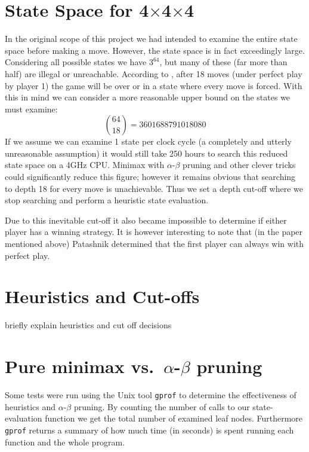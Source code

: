 \documentclass[10pt,twocolumn]{article}
\begin{document}
\section{State Space for 4$\times$4$\times$4}
In the original scope of this project we had intended to examine the entire state space
before making a move. However, the state space is in fact exceedingly large. Considering all
possible states we have $3^{64}$, but many of these (far more than half) are illegal or unreachable.
According to \cite{Patashnik1980}, after 18 moves (under perfect play by player 1)
the game will be over or in a state where every move is forced. With this in mind we can 
consider a more reasonable upper bound on the states we must examine:
 \[\binom{64}{18} = 3601688791018080\]
If we assume we can examine 1 state per clock cycle (a completely and utterly unreasonable assumption) it would
still take 250 hours to search this reduced state space on a 4GHz CPU. Minimax with $\alpha$-$\beta$ pruning
and other clever tricks could significantly reduce this figure; however it remains obvious that
searching to depth 18 for every move is unachievable. Thus we set a depth cut-off where we stop
searching and perform a heuristic state evaluation.

Due to this inevitable cut-off it also became impossible to determine if either
player has a winning strategy. It is however interesting to note that (in the paper
mentioned above) Patashnik determined that the first player can always win with perfect play. 

\section{Heuristics and Cut-offs}
briefly explain heuristics and cut off decisions



\section{Pure minimax vs.\ $\alpha$-$\beta$ pruning}
Some tests were run using the Unix tool \texttt{gprof} to determine the effectiveness
of heuristics and $\alpha$-$\beta$ pruning. By counting the number of calls
to our state-evaluation function we get the total number of examined leaf nodes.
Furthermore \texttt{gprof} returns a summary of how much time (in seconds) is spent running
each function and the whole program.
\end{document}
